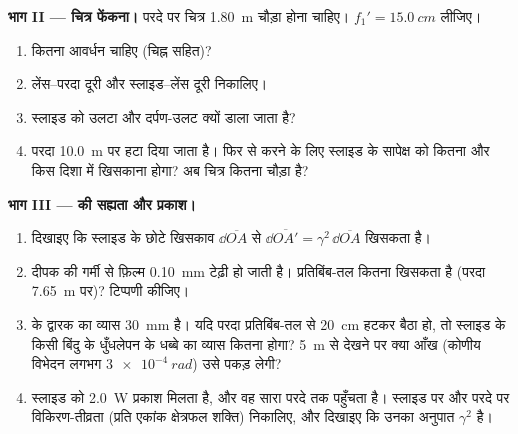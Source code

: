 \begin{problem}
\medskip
\noindent\textbf{भाग II --- चित्र फेंकना।}
परदे पर चित्र \qty{1.80}{m} चौड़ा होना चाहिए।
$f_1' = \qty{15.0}{cm}$ लीजिए।
\begin{enumerate}[resume]
  \item कितना आवर्धन चाहिए (चिह्न सहित)?
  \item लेंस--परदा दूरी और स्लाइड--लेंस दूरी निकालिए।
  \item स्लाइड को उलटा और दर्पण-उलट क्यों डाला जाता है?
  \item परदा \qty{10.0}{m} पर हटा दिया जाता है। फिर से  करने के लिए
        स्लाइड के सापेक्ष  को कितना और किस दिशा में खिसकाना होगा? अब
        चित्र कितना चौड़ा है?
\end{enumerate}

\medskip
\noindent\textbf{भाग III ---  की सह्यता और प्रकाश।}
\begin{enumerate}[resume]
  \item दिखाइए कि स्लाइड के छोटे खिसकाव $\dd\overline{OA}$ से 
        $\dd\overline{OA'} = \gamma^2\,\dd\overline{OA}$ खिसकता है।
  \item दीपक की गर्मी से फ़िल्म \qty{0.10}{mm} टेढ़ी हो जाती है। प्रतिबिंब-तल
        कितना खिसकता है (परदा \qty{7.65}{m} पर)? टिप्पणी कीजिए।
  \item {} के द्वारक का व्यास \qty{30}{mm} है। यदि परदा प्रतिबिंब-तल से
        \qty{20}{cm} हटकर बैठा हो, तो स्लाइड के किसी बिंदु के धुँधलेपन के
        धब्बे का व्यास कितना होगा? \qty{5}{m} से देखने पर क्या आँख (कोणीय
        विभेदन लगभग $\qty{3e-4}{rad}$) उसे पकड़ लेगी?
  \item स्लाइड को \qty{2.0}{W} प्रकाश मिलता है, और वह सारा परदे तक पहुँचता
        है। स्लाइड पर और परदे पर विकिरण-तीव्रता (प्रति एकांक क्षेत्रफल
        शक्ति) निकालिए, और दिखाइए कि उनका अनुपात $\gamma^2$ है।
\end{enumerate}


\end{problem}
